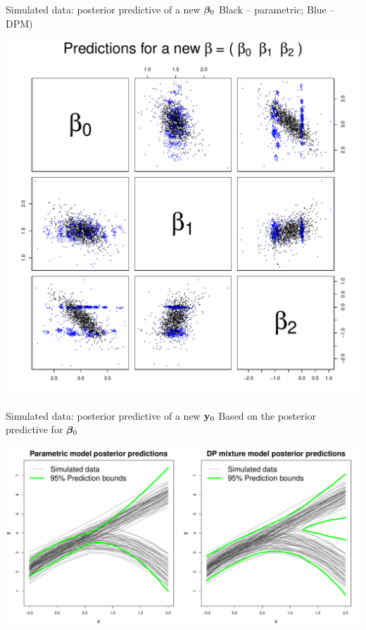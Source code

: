 \documentclass[mathserif, 12pt, t]{beamer}
\begin{document}
\begin{frame}{Simulated data: posterior predictive of a new $\mathbf{\bm{\beta}}_0$}
Black -- parametric; Blue -- DPM)

\begin{center}
\includegraphics[scale=0.30]{../figs/toy_theta_0.pdf}
\end{center}

\end{frame}

\begin{frame}{Simulated data: posterior predictive of a new $\mathbf{\bm{y}}_0$}
Based on the posterior predictive for $\mathbf{\bm{\beta}}_0$

\begin{center}
\includegraphics[scale=0.25]{../figs/toy_y_0.pdf}
\end{center}

\end{frame}
\end{document}
